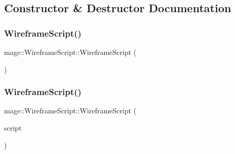 \subsection{Constructor \& Destructor Documentation}
\hypertarget{classmage_1_1_wireframe_script_a3dc73b04bdab31e19b46360bfe5f4766}{}\label{classmage_1_1_wireframe_script_a3dc73b04bdab31e19b46360bfe5f4766} 
\subsubsection{\texorpdfstring{Wireframe\+Script()}{WireframeScript()}\hspace{0.1cm}{\footnotesize\ttfamily [1/3]}}
{\footnotesize\ttfamily mage\+::\+Wireframe\+Script\+::\+Wireframe\+Script (\begin{DoxyParamCaption}{ }\end{DoxyParamCaption})}

\hypertarget{classmage_1_1_wireframe_script_abd35f16fba0de4d370728e832d757473}{}\label{classmage_1_1_wireframe_script_abd35f16fba0de4d370728e832d757473} 
\subsubsection{\texorpdfstring{Wireframe\+Script()}{WireframeScript()}\hspace{0.1cm}{\footnotesize\ttfamily [2/3]}}
{\footnotesize\ttfamily mage\+::\+Wireframe\+Script\+::\+Wireframe\+Script (\begin{DoxyParamCaption}\item[{const \hyperlink{classmage_1_1_wireframe_script}{Wireframe\+Script} \&}]{script }\end{DoxyParamCaption})\hspace{0.3cm}{\ttfamily [delete]}}

\hypertarget{classmage_1_1_wireframe_script_a465b1b144af8376b2f9afdd11c51af98}{}\label{classmage_1_1_wireframe_script_a465b1b144af8376b2f9afdd11c51af98} 
